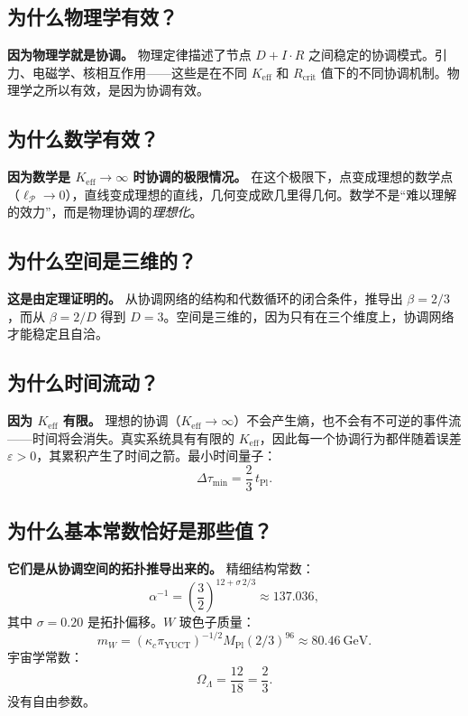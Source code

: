 \documentclass[12pt,a4paper]{article}
\newcommand{\Keff}{K_{\mathrm{eff}}}
\newcommand{\kappac}{\kappa_c}
\newcommand{\eps}{\varepsilon}
\newcommand{\betaf}{\beta}
\newcommand{\tPl}{t_{\mathrm{Pl}}}
\newcommand{\piYUCT}{\pi_{\mathrm{YUCT}}}
\newcommand{\Rcrit}{R_{\mathrm{crit}}}
\newcommand{\calP}{\mathcal{P}}
\begin{document}
	\subsection{为什么物理学有效？}
	
	\textbf{因为物理学就是协调。} 物理定律描述了节点 \(D+I\cdot R\) 之间稳定的协调模式。引力、电磁学、核相互作用——这些是在不同 \(\Keff\) 和 \(\Rcrit\) 值下的不同协调机制。物理学之所以有效，是因为协调有效。
	
	\subsection{为什么数学有效？}
	
	\textbf{因为数学是 \(\Keff \to \infty\) 时协调的极限情况。} 在这个极限下，点变成理想的数学点（\(\ell_{\calP} \to 0\)），直线变成理想的直线，几何变成欧几里得几何。数学不是“难以理解的效力”，而是物理协调的\emph{理想化}。
	
	\subsection{为什么空间是三维的？}
	
	\textbf{这是由定理证明的。} 从协调网络的结构和代数循环的闭合条件，推导出 \(\betaf = 2/3\)，而从 \(\betaf = 2/D\) 得到 \(D=3\)。空间是三维的，因为只有在三个维度上，协调网络才能稳定且自洽。
	
	\subsection{为什么时间流动？}
	
	\textbf{因为 \(\Keff\) 有限。} 理想的协调（\(\Keff \to \infty\)）不会产生熵，也不会有不可逆的事件流——时间将会消失。真实系统具有有限的 \(\Keff\)，因此每一个协调行为都伴随着误差 \(\eps > 0\)，其累积产生了时间之箭。最小时间量子：
	\[
	\Delta \tau_{\min} = \frac{2}{3}\,\tPl.
	\]
	
	\subsection{为什么基本常数恰好是那些值？}
	
	\textbf{它们是从协调空间的拓扑推导出来的。} 精细结构常数：
	\[
	\alpha^{-1} = \left(\frac{3}{2}\right)^{12 + \sigma\,2/3} \approx 137.036,
	\]
	其中 \(\sigma = 0.20\) 是拓扑偏移。\(W\) 玻色子质量：
	\[
	m_W = (\kappac \piYUCT)^{-1/2} M_{\mathrm{Pl}} (2/3)^{96} \approx 80.46\ \text{GeV}.
	\]
	宇宙学常数：
	\[
	\Omega_\Lambda = \frac{12}{18} = \frac{2}{3}.
	\]
	没有自由参数。
	
\end{document}

